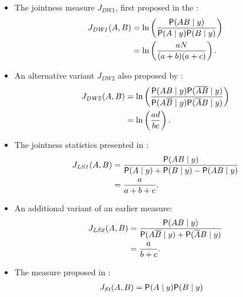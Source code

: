 \begin{itemize}\label{sec:jointess_numbers}
	\item The jointness measure $J_{\mathit{DW1}}$, first
		proposed in the \cite{DoppelhoferWeeks2005}:
		\begin{align}
			\begin{split}
				J_{\mathit{DW1}}(A,B) &  = \ln\left(\frac{\mathsf{P}(AB\mid y)}
				{\mathsf{P}(A\mid y) \mathsf{P}(B\mid y)}\right)\\
				& = \ln\left(\frac{aN}{(a+b)(a+c)}\right).
			\end{split}
			\label{DW_jointness1}
		\end{align}
	\item An alternative variant $J_{\mathit{DW2}}$ also
		proposed by \cite{DoppelhoferWeeks2009}:
		\begin{align}
			\begin{split}
				J_{\mathit{DW2}}(A,B) & =\ln\left(\frac {\mathsf{P}(AB \mid y)\mathsf{P}(\overline{A}\overline{B} \mid y)}
				{\mathsf{P}(A\overline{B}\mid y)\mathsf{P}(\overline{A}B\mid y)}\right) \\
				& = \ln\left(\frac{ad}{bc}\right).
			\end{split}
			\label{DW_jointness2}
		\end{align}
	\item The jointness statistics presented in \cite{LeySteel2007}:
		\begin{align}
			\begin{split}
				J_{\mathit{LS1}}(A,B) & = \frac{\mathsf{P}(AB\mid y)}{\mathsf{P}(A\mid y)+\mathsf{P}(B\mid y)-\mathsf{P}(AB\mid y)} \\
				& = \frac{a}{a+b+c}.
			\end{split}
			\label{LS_jointness1}
		\end{align}
	\item An additional variant of an earlier measure:
		\begin{align}
			\begin{split}
				J_{\mathit{LS2}}(A,B) & = \frac{\mathsf{P}(AB\mid y)}{\mathsf{P}(A\overline{B}\mid y)+\mathsf{P}(\overline{A}B\mid y)} \\
				& =  \frac{a}{b+c}.
			\end{split}
			\label{LS_jointness2}
		\end{align}
	\item The measure  proposed in \cite{Strachan2009}:
		\begin{align}
			\begin{split}
				J_{\mathit{St}}(A,B) & = \Prob(A\mid y)\Prob(B\mid y)

\end{split}
\end{align}
\end{itemize}
